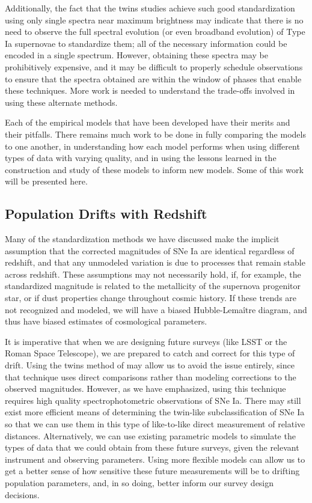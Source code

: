 Additionally, the fact that the twins studies achieve such good standardization using only single spectra near maximum brightness may indicate that there is no need to observe the full spectral evolution (or even broadband evolution) of Type Ia supernovae to standardize them; all of the necessary information could be encoded in a single spectrum. However, obtaining these spectra may be prohibitively expensive, and it may be difficult to properly schedule observations to ensure that the spectra obtained are within the window of phases that enable these techniques. More work is needed to understand the trade-offs involved in using these alternate methods.

Each of the empirical models that have been developed have their merits and their pitfalls. There remains much work to be done in fully comparing the models to one another, in understanding how each model performs when using different types of data with varying quality, and in using the lessons learned in the construction and study of these models to inform new models. Some of this work will be presented here.

\subsection{Population Drifts with Redshift}
Many of the standardization methods we have discussed make the implicit assumption that the corrected magnitudes of SNe Ia are identical regardless of redshift, and that any unmodeled variation is due to processes that remain stable across redshift. These assumptions may not necessarily hold, if, for example, the standardized magnitude is related to the metallicity of the supernova progenitor star, or if dust properties change throughout cosmic history. If these trends are not recognized and modeled, we will have a biased Hubble-Lema\^{i}tre diagram, and thus have biased estimates of cosmological parameters.

It is imperative that when we are designing future surveys (like LSST or the Roman Space Telescope), we are prepared to catch and correct for this type of drift. Using the twins method of \citet{fakhouri_improving_2015} may allow us to avoid the issue entirely, since that technique uses direct comparisons rather than modeling corrections to the observed magnitudes. However, as we have emphasized, using this technique requires high quality spectrophotometric observations of SNe Ia. There may still exist more efficient means of determining the twin-like subclassification of SNe Ia so that we can use them in this type of like-to-like direct measurement of relative distances. Alternatively, we can use existing parametric models to simulate the types of data that we could obtain from these future surveys, given the relevant instrument and observing parameters. Using more flexible models can allow us to get a better sense of how sensitive these future measurements will be to drifting population parameters, and, in so doing, better inform our survey design decisions.


